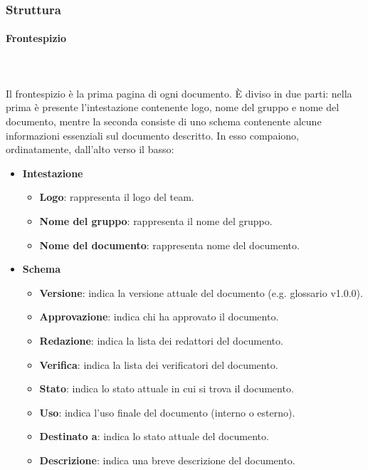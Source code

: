 \documentclass[../norme-di-progetto.tex]{subfiles}
\begin{document}
\subsubsection{Struttura}
\label{subs:struttura}
\paragraph{Frontespizio}\mbox{}\\
\label{par:frontespizio}
\\Il frontespizio è la prima pagina di ogni documento. È diviso in due parti: nella prima è presente l'intestazione contenente logo, nome del gruppo e nome del documento, mentre la seconda consiste di uno schema contenente alcune informazioni essenziali sul documento descritto. In esso compaiono, ordinatamente, dall'alto verso il basso:
\begin{itemize}
	\item \textbf{Intestazione}
	\begin{itemize}
		\item \textbf{Logo}: rappresenta il logo del team.
		\item \textbf{Nome del gruppo}: rappresenta il nome del gruppo.
		\item \textbf{Nome del documento}: rappresenta nome del documento.
	\end{itemize}
	\item \textbf{Schema}
	\begin{itemize}
		\item \textbf{Versione}: indica la versione attuale del documento (e.g. glossario v1.0.0).
		\item \textbf{Approvazione}: indica chi ha approvato il documento.
		\item \textbf{Redazione}: indica la lista dei redattori del documento.
		\item \textbf{Verifica}: indica la lista dei verificatori del documento.
		\item \textbf{Stato}: indica lo stato attuale in cui si trova il documento.
		\item \textbf{Uso}: indica l'uso finale del documento (interno o esterno).
		\item \textbf{Destinato a}: indica lo stato attuale del documento.
		\item \textbf{Descrizione}: indica una breve descrizione del documento. 
	\end{itemize}
\end{itemize}
\end{document}
